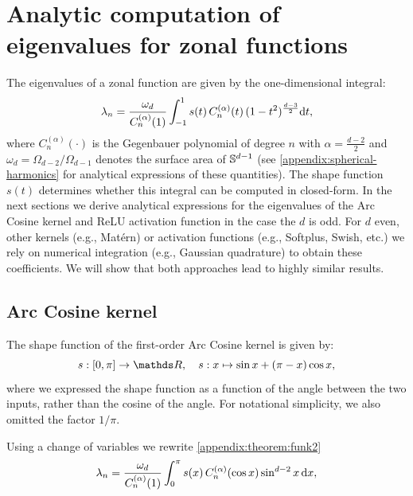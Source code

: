 
\chapter{Analytic computation of eigenvalues for zonal functions}
\label{app:sec:compute-eigenvalues}


The eigenvalues of a zonal function are given by the one-dimensional integral:
\begin{equation}
    \label{appendix:theorem:funk2}
    \lambda_{n} = 
   \frac{\omega_{d}}{C_n^{(\alpha)}(1)} \int_{-1}^1 s(t)\,C_n^{(\alpha)}(t)\,(1 - t^2)^{\frac{d-3}{2}} \mathrm{d}{t},
\end{equation}
where $C_n^{(\alpha)}(\cdot)$ is the Gegenbauer polynomial of degree $n$ with $\alpha = \frac{d-2}{2}$ and $\omega_{d} = \Omega_{d-2} / \Omega_{d-1}$ denotes the surface area of $\mathbb{S}^{d-1}$ (see \cref{appendix:spherical-harmonics} for analytical expressions of these quantities). The shape function $s(t)$ determines whether this integral can be computed in closed-form. In the next sections we derive analytical expressions for the eigenvalues of the Arc Cosine kernel and ReLU activation function in the case the $d$ is odd. For $d$ even, other kernels (e.g., Mat\'ern) or activation functions (e.g., Softplus, Swish, etc.) we rely on numerical integration (e.g., Gaussian quadrature) to obtain these coefficients. We will show that both approaches lead to highly similar results.

\section{Arc Cosine kernel}
\label{sec:appendix:compute-eigenvalues-arccosine}

The shape function of the first-order Arc Cosine kernel \citep{cho2009kernel} is given by:
\begin{equation}
    s:[0, \pi] \rightarrow \Reals,\quad s: x \mapsto \sin x + (\pi - x) \cos x,
\end{equation}
where we expressed the shape function as a function of the angle between the two inputs, rather than the cosine of the angle. For notational simplicity, we also omitted the factor $1 / \pi$.

Using a change of variables we rewrite \cref{appendix:theorem:funk2}
\begin{equation}
    \lambda_n
    =  \frac{\omega_{d}}{C_n^{(\alpha)}(1)}  \int_{0}^\pi s(x)\,C_n^{(\alpha)}(\cos x) \sin^{d-2} x\,\mathrm{d}{x},
\end{equation}

